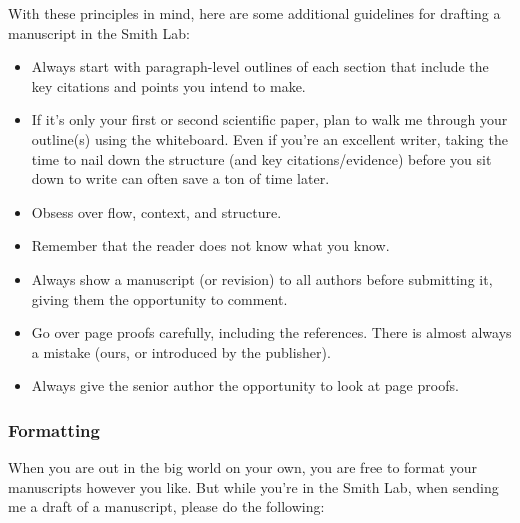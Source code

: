 \documentclass[letterpaper,11pt,oneside]{memoir}
\begin{document}
With these principles in mind, here are some additional guidelines for drafting a manuscript in the Smith Lab:

\begin{itemize}[noitemsep]
\item Always start with paragraph-level outlines of each section that include the key citations and points you intend to make.
\item If it's only your first or second scientific paper, plan to walk me through your outline(s) using the whiteboard. Even if you're an excellent writer, taking the time to nail down the structure (and key citations/evidence) before you sit down to write can often save a ton of time later.
\item Obsess over flow, context, and structure.
\item Remember that the reader does not know what you know.
\item Always show a manuscript (or revision) to all authors before submitting it, giving them the opportunity to comment.
\item Go over page proofs carefully, including the references. There is almost always a mistake (ours, or introduced by the publisher).
\item Always give the senior author the opportunity to look at page proofs.
\end{itemize}


\subsubsection{Formatting}

When you are out in the big world on your own, you are free to format your manuscripts however you like. But while you're in the Smith Lab, when sending me a draft of a manuscript, please do the following:
\end{document}

